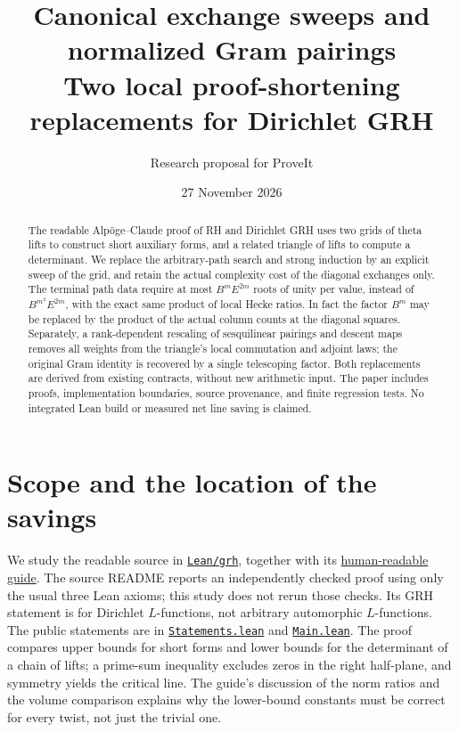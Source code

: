 \documentclass[11pt]{article}
\title{Canonical exchange sweeps and normalized Gram pairings\\\large Two local proof-shortening replacements for Dirichlet GRH}
\author{Research proposal for ProveIt}
\date{27 November 2026}
\newcommand{\src}[2]{\href{https://github.com/VladimirReshetnikov/ProveIt/blob/main/Analysis/GeneralizedRiemannHypothesis/Lean/grh/src/#1}{#2}}
\newcommand{\code}[1]{\texttt{#1}}
\begin{document}
\maketitle
\begin{abstract}
The readable Alp\"oge--Claude proof of RH and Dirichlet GRH uses two grids of theta lifts to construct short auxiliary forms, and a related triangle of lifts to compute a determinant. We replace the arbitrary-path search and strong induction by an explicit sweep of the grid, and retain the actual complexity cost of the diagonal exchanges only. The terminal path data require at most $B^m E^{2m}$ roots of unity per value, instead of $B^{m^2} E^{2m}$, with the exact same product of local Hecke ratios. In fact the factor $B^m$ may be replaced by the product of the actual column counts at the diagonal squares. Separately, a rank-dependent rescaling of sesquilinear pairings and descent maps removes all weights from the triangle's local commutation and adjoint laws; the original Gram identity is recovered by a single telescoping factor. Both replacements are derived from existing contracts, without new arithmetic input. The paper includes proofs, implementation boundaries, source provenance, and finite regression tests. No integrated Lean build or measured net line saving is claimed.
\end{abstract}
\tableofcontents
\section{Scope and the location of the savings}
We study the readable source in \href{https://github.com/VladimirReshetnikov/ProveIt/tree/main/Analysis/GeneralizedRiemannHypothesis/Lean/grh}{\code{Lean/grh}}, together with its \href{https://github.com/VladimirReshetnikov/ProveIt/tree/main/Analysis/GeneralizedRiemannHypothesis/docs/guide}{human-readable guide}. The source README reports an independently checked proof using only the usual three Lean axioms; this study does not rerun those checks. Its GRH statement is for Dirichlet $L$-functions, not arbitrary automorphic $L$-functions. The public statements are in \src{Statements.lean}{\code{Statements.lean}} and \src{Main.lean}{\code{Main.lean}}. The proof compares upper bounds for short forms and lower bounds for the determinant of a chain of lifts; a prime-sum inequality excludes zeros in the right half-plane, and symmetry yields the critical line. The guide's discussion of the norm ratios and the volume comparison explains why the lower-bound constants must be correct for every twist, not just the trivial one.
\end{document}
